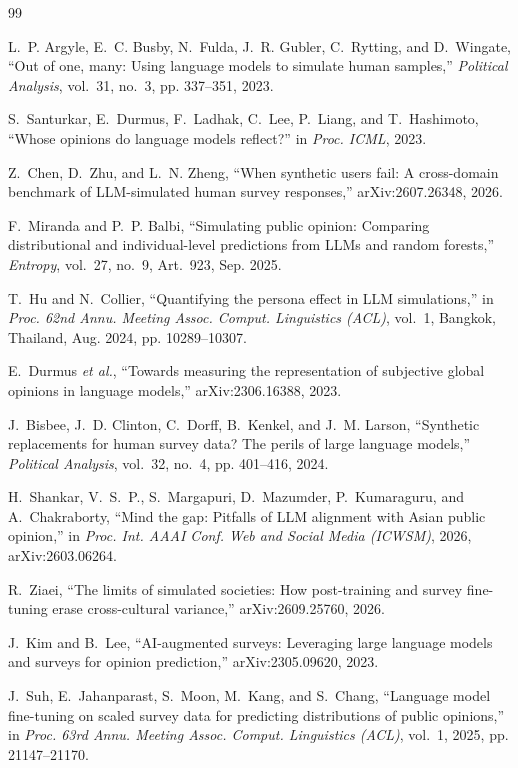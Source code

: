 \documentclass[conference]{IEEEtran}
\begin{document}
\begin{thebibliography}{99}

L.~P. Argyle, E.~C. Busby, N.~Fulda, J.~R. Gubler, C.~Rytting, and D.~Wingate, ``Out of one, many: Using language models to simulate human samples,'' \emph{Political Analysis}, vol.~31, no.~3, pp. 337--351, 2023.

S.~Santurkar, E.~Durmus, F.~Ladhak, C.~Lee, P.~Liang, and T.~Hashimoto, ``Whose opinions do language models reflect?'' in \emph{Proc. ICML}, 2023.

Z.~Chen, D.~Zhu, and L.~N. Zheng, ``When synthetic users fail: A cross-domain benchmark of LLM-simulated human survey responses,'' arXiv:2607.26348, 2026.

F.~Miranda and P.~P. Balbi, ``Simulating public opinion: Comparing distributional and individual-level predictions from LLMs and random forests,'' \emph{Entropy}, vol.~27, no.~9, Art.~923, Sep. 2025.

T.~Hu and N.~Collier, ``Quantifying the persona effect in LLM simulations,'' in \emph{Proc. 62nd Annu. Meeting Assoc. Comput. Linguistics (ACL)}, vol.~1, Bangkok, Thailand, Aug. 2024, pp. 10289--10307.

E.~Durmus \emph{et al.}, ``Towards measuring the representation of subjective global opinions in language models,'' arXiv:2306.16388, 2023.

J.~Bisbee, J.~D. Clinton, C.~Dorff, B.~Kenkel, and J.~M. Larson, ``Synthetic replacements for human survey data? The perils of large language models,'' \emph{Political Analysis}, vol.~32, no.~4, pp. 401--416, 2024.

H.~Shankar, V.~S.~P., S.~Margapuri, D.~Mazumder, P.~Kumaraguru, and A.~Chakraborty, ``Mind the gap: Pitfalls of LLM alignment with Asian public opinion,'' in \emph{Proc. Int. AAAI Conf. Web and Social Media (ICWSM)}, 2026, arXiv:2603.06264.

R.~Ziaei, ``The limits of simulated societies: How post-training and survey fine-tuning erase cross-cultural variance,'' arXiv:2609.25760, 2026.

J.~Kim and B.~Lee, ``AI-augmented surveys: Leveraging large language models and surveys for opinion prediction,'' arXiv:2305.09620, 2023.

J.~Suh, E.~Jahanparast, S.~Moon, M.~Kang, and S.~Chang, ``Language model fine-tuning on scaled survey data for predicting distributions of public opinions,'' in \emph{Proc. 63rd Annu. Meeting Assoc. Comput. Linguistics (ACL)}, vol.~1, 2025, pp. 21147--21170.


\end{thebibliography}
\end{document}

